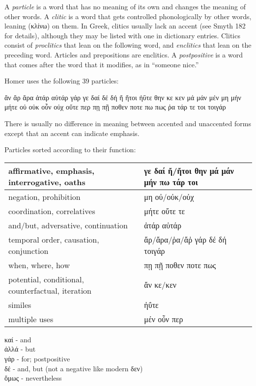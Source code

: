 \begin{small}
A \emph{particle} is a word that has no meaning of its own and changes the meaning of other words.
A \emph{clitic} is a word that gets controlled phonologically by other words, leaning (κλίνω) on them. In Greek,
clitics usually lack an accent (see Smyth 182 for details), although they may be listed with one in dictionary entries.
Clitics consist of \emph{proclitics} that lean on the following word, and
\emph{enclitics} that lean on the preceding word. Articles and prepositions are enclitics.
A \emph{postpositive} is a word that comes after the word that it modifies, as in ``someone nice.''


Homer uses the following 39 particles:


ἄν ἄρ ἄρα ἀτάρ αὐτάρ γάρ γε δαί δέ δή ἤ ἤτοι ἠΰτε θην κε κεν μά μάν μέν μη μήν μήτε οὐ οὐκ οὖν οὐχ οὔτε περ πῃ πῇ ποθεν ποτε πω πως ῥα τάρ τε τοι τοιγάρ

There is usually no difference in meaning between accented and unaccented forms except that an accent can indicate emphasis.

Particles sorted according to their function:

\begin{tabular}{p{1.6in}p{2.7in}}
affirmative, emphasis, \mbox{interrogative}, oaths &
  γε δαί ἤ/ἤτοι θην μά μάν μήν πω τάρ τοι \tabularnewline \hline
negation, prohibition &
  μη οὐ/οὐκ/οὐχ \tabularnewline \hline
coordination, correlatives &
  μήτε οὔτε τε \tabularnewline \hline
and/but, adversative, \mbox{continuation} &
  ἀτάρ αὐτάρ \tabularnewline \hline
temporal order, causation, conjunction &
  ἄρ/ἄρα/ῥα/ἄῤ γάρ δέ δή τοιγάρ \tabularnewline \hline
when, where, how &
  πῃ πῇ ποθεν ποτε πως \tabularnewline \hline
potential, conditional, \mbox{counterfactual}, iteration &
  ἄν κε/κεν \tabularnewline \hline
similes &
  ἠΰτε \tabularnewline \hline
multiple uses &
  μέν οὖν περ
\end{tabular}


καί - and\\
ἀλλά - but\\
γάρ - for; postpositive\\
δέ - and, but (not a negative like modern δεν)\\
ὅμως - nevertheless\\


\end{small}
